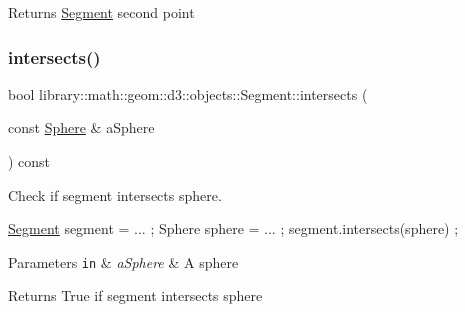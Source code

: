 \begin{DoxyReturn}{Returns}
\hyperlink{classlibrary_1_1math_1_1geom_1_1d3_1_1objects_1_1_segment}{Segment} second point 
\end{DoxyReturn}
\mbox{\label{classlibrary_1_1math_1_1geom_1_1d3_1_1objects_1_1_segment_a9919183ce212b474e418685db50891fc}} 
\subsubsection{\texorpdfstring{intersects()}{intersects()}\hspace{0.1cm}{\footnotesize\ttfamily [1/2]}}
{\footnotesize\ttfamily bool library\+::math\+::geom\+::d3\+::objects\+::\+Segment\+::intersects (\begin{DoxyParamCaption}\item[{const \hyperlink{classlibrary_1_1math_1_1geom_1_1d3_1_1objects_1_1_sphere}{Sphere} \&}]{a\+Sphere }\end{DoxyParamCaption}) const}



Check if segment intersects sphere. 


\begin{DoxyCode}
\hyperlink{classlibrary_1_1math_1_1geom_1_1d3_1_1objects_1_1_segment_a5562342d1edf2f52e37ce1bc138ee7d7}{Segment} segment = ... ;
Sphere sphere = ... ;
segment.intersects(sphere) ;
\end{DoxyCode}



\begin{DoxyParams}[1]{Parameters}
\mbox{\tt in}  & {\em a\+Sphere} & A sphere \\
\hline
\end{DoxyParams}
\begin{DoxyReturn}{Returns}
True if segment intersects sphere 
\end{DoxyReturn}
\mbox{\label{classlibrary_1_1math_1_1geom_1_1d3_1_1objects_1_1_segment_af6d7eb00a6886d190c03e8b8e4220f33}} 
